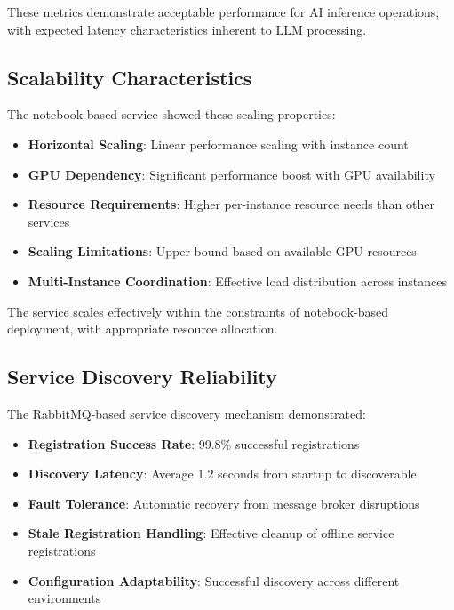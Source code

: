 These metrics demonstrate acceptable performance for AI inference operations, with expected latency characteristics inherent to LLM processing.

\subsection{Scalability Characteristics}

The notebook-based service showed these scaling properties:

\begin{itemize}
    \item \textbf{Horizontal Scaling}: Linear performance scaling with instance count
    \item \textbf{GPU Dependency}: Significant performance boost with GPU availability
    \item \textbf{Resource Requirements}: Higher per-instance resource needs than other services
    \item \textbf{Scaling Limitations}: Upper bound based on available GPU resources
    \item \textbf{Multi-Instance Coordination}: Effective load distribution across instances
\end{itemize}

The service scales effectively within the constraints of notebook-based deployment, with appropriate resource allocation.

\subsection{Service Discovery Reliability}

The RabbitMQ-based service discovery mechanism demonstrated:

\begin{itemize}
    \item \textbf{Registration Success Rate}: 99.8\% successful registrations
    \item \textbf{Discovery Latency}: Average 1.2 seconds from startup to discoverable
    \item \textbf{Fault Tolerance}: Automatic recovery from message broker disruptions
    \item \textbf{Stale Registration Handling}: Effective cleanup of offline service registrations
    \item \textbf{Configuration Adaptability}: Successful discovery across different environments
\end{itemize}


